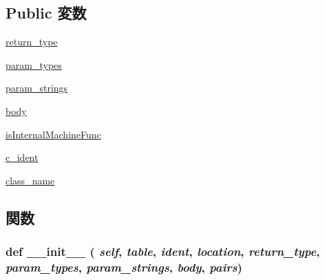 \subsection*{Public 変数}
\begin{DoxyCompactItemize}
\item 
\hyperlink{classslicc_1_1symbols_1_1Func_1_1Func_a8158a2d869c53eb8f38c869b380a1209}{return\_\-type}
\item 
\hyperlink{classslicc_1_1symbols_1_1Func_1_1Func_adee0355d5a54fc002b5fd1103cca688c}{param\_\-types}
\item 
\hyperlink{classslicc_1_1symbols_1_1Func_1_1Func_acf75fcf7085c32a79bd047dea0b22f49}{param\_\-strings}
\item 
\hyperlink{classslicc_1_1symbols_1_1Func_1_1Func_a14d48c2e9f05d0b03044eb45f308fcb0}{body}
\item 
\hyperlink{classslicc_1_1symbols_1_1Func_1_1Func_a38fe0257b66bb2764dec0fe056dcb0c9}{isInternalMachineFunc}
\item 
\hyperlink{classslicc_1_1symbols_1_1Func_1_1Func_a4bbd0f8fedcfccc594b11a2023a02baf}{c\_\-ident}
\item 
\hyperlink{classslicc_1_1symbols_1_1Func_1_1Func_a3378f35ca205fd422d7edb3190867861}{class\_\-name}
\end{DoxyCompactItemize}


\subsection{関数}
\hypertarget{classslicc_1_1symbols_1_1Func_1_1Func_ac775ee34451fdfa742b318538164070e}{
\subsubsection[{\_\-\_\-init\_\-\_\-}]{\setlength{\rightskip}{0pt plus 5cm}def \_\-\_\-init\_\-\_\- ( {\em self}, \/   {\em table}, \/   {\em ident}, \/   {\em location}, \/   {\em return\_\-type}, \/   {\em param\_\-types}, \/   {\em param\_\-strings}, \/   {\em body}, \/   {\em pairs})}}
\label{classslicc_1_1symbols_1_1Func_1_1Func_ac775ee34451fdfa742b318538164070e}



